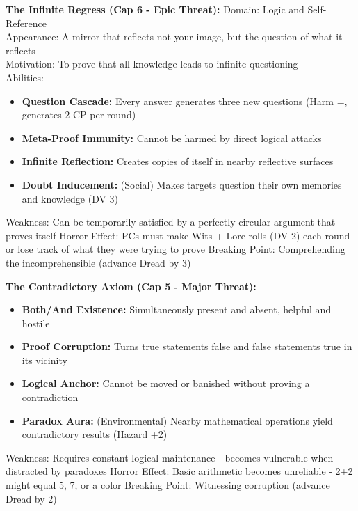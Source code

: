 \documentclass[11pt]{article}
\begin{document}
\textbf{The Infinite Regress (Cap 6 - Epic Threat):}
Domain: Logic and Self-Reference \\
Appearance: A mirror that reflects not your image, but the question of what it reflects \\
Motivation: To prove that all knowledge leads to infinite questioning \\
Abilities: 
\begin{itemize}
    \item \textbf{Question Cascade:} Every answer generates three new questions (Harm =, generates 2 CP per round)
    \item \textbf{Meta-Proof Immunity:} Cannot be harmed by direct logical attacks
    \item \textbf{Infinite Reflection:} Creates copies of itself in nearby reflective surfaces
    \item \textbf{Doubt Inducement:} (Social) Makes targets question their own memories and knowledge (DV 3)
\end{itemize}
Weakness: Can be temporarily satisfied by a perfectly circular argument that proves itself
Horror Effect: PCs must make Wits + Lore rolls (DV 2) each round or lose track of what they were trying to prove
Breaking Point: Comprehending the incomprehensible (advance Dread by 3)

\textbf{The Contradictory Axiom (Cap 5 - Major Threat):}
\begin{itemize}
    \item \textbf{Both/And Existence:} Simultaneously present and absent, helpful and hostile
    \item \textbf{Proof Corruption:} Turns true statements false and false statements true in its vicinity
    \item \textbf{Logical Anchor:} Cannot be moved or banished without proving a contradiction
    \item \textbf{Paradox Aura:} (Environmental) Nearby mathematical operations yield contradictory results (Hazard +2)
\end{itemize}
Weakness: Requires constant logical maintenance - becomes vulnerable when distracted by paradoxes
Horror Effect: Basic arithmetic becomes unreliable - 2+2 might equal 5, 7, or a color
Breaking Point: Witnessing corruption (advance Dread by 2)
\end{document}
